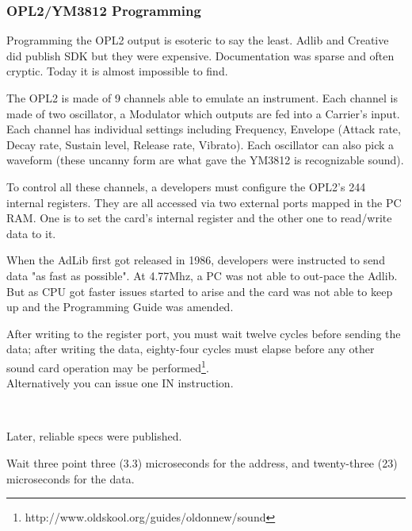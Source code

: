 \subsubsection{OPL2/YM3812 Programming}
\par
Programming the OPL2 output is esoteric to say the least. Adlib and Creative did publish SDK but they were expensive.  Documentation was sparse and often cryptic. Today it is almost impossible to find.\\
\par
The OPL2 is made of 9 channels able to emulate an instrument. Each channel is made of two oscillator, a Modulator which outputs are fed into a Carrier's input. Each channel has individual settings including Frequency, Envelope (Attack rate, Decay rate, Sustain level, Release rate, Vibrato). Each oscillator can also pick a waveform (these uncanny form are what gave the YM3812 is recognizable sound).\\
\par
 To control all these channels, a developers must configure the OPL2's 244 internal registers. They are all accessed via two external ports mapped in the PC RAM. One is to set the card's internal register and the other one to read/write data to it.\\
\par
\begin{minipage}{\textwidth}

\end{minipage}
\par
When the AdLib first got released in 1986, developers were instructed to send data "as fast as possible". At 4.77Mhz, a PC was not able to out-pace the Adlib. But as CPU got faster issues started to arise and the card was not able to keep up and the Programming Guide was amended.\\
\par

\begin{fancyquotes}
After writing to the register port, you must wait twelve cycles before sending the data; after writing the data, eighty-four cycles must elapse before any other sound card operation may be performed\footnote{http://www.oldskool.org/guides/oldonnew/sound}.
 \bigskip \\
 Alternatively you can issue one IN instruction.
 \bigskip \\
 \end{fancyquotes}
\\
\par
Later, reliable specs were published.\\
\par
\begin{fancyquotes}
Wait three point three (3.3) microseconds for the address, and twenty-three (23) microseconds for the data.\\
 \end{fancyquotes}
 

